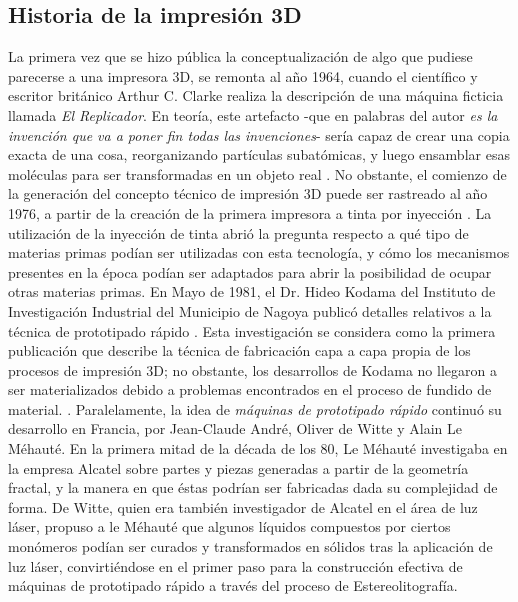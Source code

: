 \subsection{Historia de la impresión 3D}

La primera vez que se hizo pública la conceptualización de algo que pudiese parecerse a una impresora 3D, se remonta al año 1964, cuando el científico y escritor británico Arthur C. Clarke realiza la descripción de una máquina ficticia llamada \textit{El Replicador}. En teoría, este artefacto -que en palabras del autor \textit{es la invención que va a poner fin todas las invenciones}- sería capaz de crear una copia exacta de una cosa, reorganizando partículas subatómicas, y luego ensamblar esas moléculas para ser transformadas en un objeto real \parencite{renstrom2012}. No obstante, el comienzo de la generación del concepto técnico de impresión 3D puede ser rastreado al año 1976, a partir de la creación de la primera impresora a tinta por inyección \parencite{maxey2013}. La utilización de la inyección de tinta abrió la pregunta respecto a qué tipo de materias primas podían ser utilizadas con esta tecnología, y cómo los mecanismos presentes en la época podían ser adaptados para abrir la posibilidad de ocupar otras materias primas. En Mayo de 1981, el Dr. Hideo Kodama del Instituto de Investigación Industrial del Municipio de Nagoya publicó detalles relativos a la técnica de prototipado rápido \parencite{maxey2013}. Esta investigación se considera como la primera publicación que describe la técnica de fabricación capa a capa propia de los procesos de impresión 3D; no obstante, los desarrollos de Kodama no llegaron a ser materializados debido a problemas encontrados en el proceso de fundido de material. \parencite{tresdsourced2020}. Paralelamente, la idea de \textit{máquinas de prototipado rápido} continuó su desarrollo en Francia, por Jean-Claude André, Oliver de Witte y Alain Le Méhauté. En la primera mitad de la década de los 80, Le Méhauté investigaba en la empresa Alcatel sobre partes y piezas generadas a partir de la geometría fractal, y la manera en que éstas podrían ser fabricadas dada su complejidad de forma.
De Witte, quien era también investigador de Alcatel en el área de luz láser, propuso a le Méhauté que algunos líquidos compuestos por ciertos monómeros podían ser curados y transformados en sólidos tras la aplicación de luz láser, convirtiéndose en el primer paso para la construcción efectiva de máquinas de prototipado rápido a través del proceso de Estereolitografía. 

